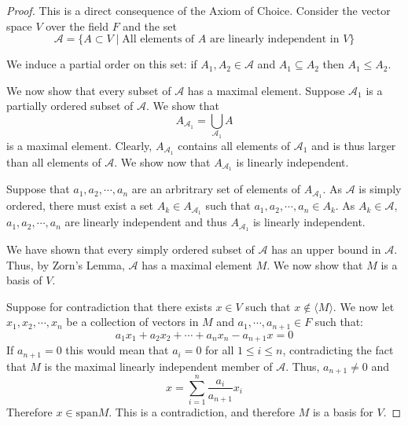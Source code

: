 \begin{proof}
  This is a direct consequence of the Axiom of Choice.
  Consider the vector space $V$ over the field $F$ and the set
  \[
    \mathcal{A} = \{A \subset V \mid \text{All elements of } A \text{ are linearly independent in } V \}    
  \]

  We induce a partial order on this set: if $A_1, A_2 \in \mathcal{A}$ and $A_1 \subseteq A_2$ then $A_1 \leq A_2$.

  We now show that every subset of $\mathcal{A}$ has a maximal element. Suppose $\mathcal{A}_1$ is a partially ordered subset of $\mathcal{A}$. We show that
\begin{equation*}
  A_{\mathcal{A}_1} = \bigcup_{\mathcal{A}_1}A
\end{equation*}
is a maximal element. Clearly, $A_{\mathcal{A}_1}$ contains all elements of $\mathcal{A}_1$ and is thus larger than all elements of $\mathcal{A}$. We show now that $A_{\mathcal{A}_1}$ is linearly independent.

Suppose that $a_1, a_2, \cdots, a_n$ are an arbritrary set of elements of $A_{\mathcal{A}_1}$. As $\mathcal{A}$ is simply ordered, there must exist a set $A_{k} \in A_{\mathcal{A}_1}$ such that $a_1, a_2, \cdots, a_n \in A_{k}$. As $A_k \in \mathcal{A}$, $a_1, a_2, \cdots, a_n$ are linearly independent and thus $A_{\mathcal{A}_1}$ is linearly independent.
        
        We have shown that every simply ordered subset of $\mathcal{A}$ has an upper bound in $\mathcal{A}$. Thus, by Zorn's Lemma, $\mathcal{A}$ has a maximal element $M$. We now show that $M$ is a basis of $V$.

  Suppose for contradiction that there exists $x \in V$ such that $x \notin \langle M \rangle$. We now let $x_1, x_2, \cdots, x_n$ be a collection of vectors in $M$ and $a_1, \cdots,a_{n + 1} \in F$ such that:
  \[
    a_1x_1 + a_2x_2 + \cdots + a_nx_n - a_{n + 1}x = 0
  \]
  If $a_{n + 1}=0$ this would mean that $a_i = 0$ for all $1 \leq i \leq n$, contradicting the fact that $M$ is the maximal linearly independent member of $\mathcal{A}$. Thus,  $a_{n + 1}\neq 0$ and
  \[
    x = \sum_{i = 1}^n{\frac{a_i}{a_{n + 1}}x_i}    
  \]
  Therefore $x \in \mathrm{span}{M}$. This is a contradiction, and therefore $M$ is a basis for $V$.

\end{proof}


